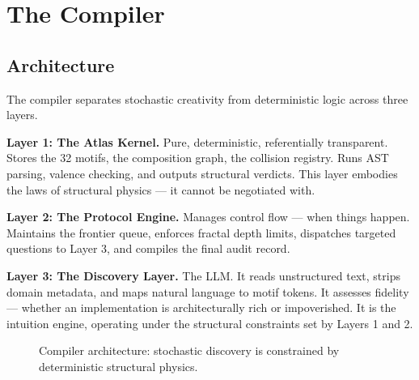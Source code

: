 \documentclass[11pt,a4paper]{article}
\begin{document}
\section{The Compiler}

\subsection{Architecture}

The compiler separates stochastic creativity from deterministic logic across three layers.

\textbf{Layer 1: The Atlas Kernel.} Pure, deterministic, referentially transparent. Stores the 32 motifs, the composition graph, the collision registry. Runs AST parsing, valence checking, and outputs structural verdicts. This layer embodies the laws of structural physics --- it cannot be negotiated with.

\textbf{Layer 2: The Protocol Engine.} Manages control flow --- when things happen. Maintains the frontier queue, enforces fractal depth limits, dispatches targeted questions to Layer 3, and compiles the final audit record.

\textbf{Layer 3: The Discovery Layer.} The LLM. It reads unstructured text, strips domain metadata, and maps natural language to motif tokens. It assesses fidelity --- whether an implementation is architecturally rich or impoverished. It is the intuition engine, operating under the structural constraints set by Layers 1 and 2.

\begin{figure}[ht]
\centering
{}
\caption{Compiler architecture: stochastic discovery is constrained by deterministic structural physics.}
\end{figure}
\end{document}
